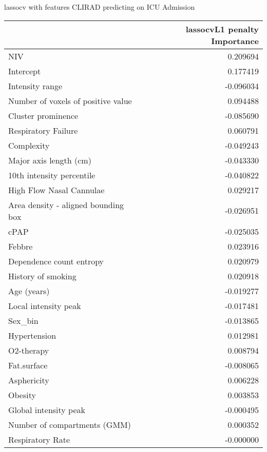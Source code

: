 {lassocv with features CLIRAD predicting on ICU Admission

\begin{tabular}{lr}
\toprule
{} &  lassocvL1 penalty Importance \\
\midrule
NIV                                 &                      0.209694 \\
Intercept                           &                      0.177419 \\
Intensity range                     &                     -0.096034 \\
Number of voxels of positive value  &                      0.094488 \\
Cluster prominence                  &                     -0.085690 \\
Respiratory Failure                 &                      0.060791 \\
Complexity                          &                     -0.049243 \\
Major axis length (cm)              &                     -0.043330 \\
10th intensity percentile           &                     -0.040822 \\
High Flow Nasal Cannulae            &                      0.029217 \\
Area density - aligned bounding box &                     -0.026951 \\
cPAP                                &                     -0.025035 \\
Febbre                              &                      0.023916 \\
Dependence count entropy            &                      0.020979 \\
History of smoking                  &                      0.020918 \\
Age (years)                         &                     -0.019277 \\
Local intensity peak                &                     -0.017481 \\
Sex\_bin                             &                     -0.013865 \\
Hypertension                        &                      0.012981 \\
O2-therapy                          &                      0.008794 \\
Fat.surface                         &                     -0.008065 \\
Asphericity                         &                      0.006228 \\
Obesity                             &                      0.003853 \\
Global intensity peak               &                     -0.000495 \\
Number of compartments (GMM)        &                      0.000352 \\
Respiratory Rate                    &                     -0.000000 \\
\bottomrule
\end{tabular}

}

